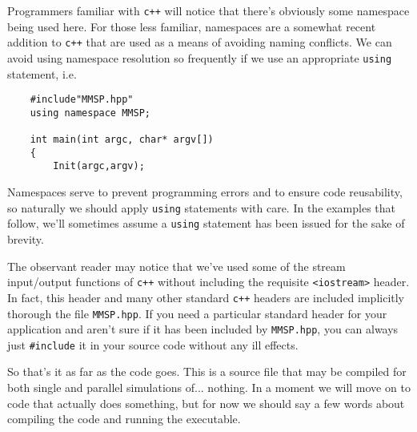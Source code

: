 Programmers familiar with {\tt c++} will notice that there's obviously some \MMSP namespace being used here.  For those less familiar, namespaces are a somewhat recent addition to {\tt c++} that are used as a means of avoiding naming conflicts.  We can avoid using namespace resolution so frequently if we use an appropriate {\tt using} statement, i.e. 
\begin{shadebox}
\begin{verbatim}
    #include"MMSP.hpp"
    using namespace MMSP;

    int main(int argc, char* argv[])
    {
        Init(argc,argv);
\end{verbatim}
\end{shadebox}
Namespaces serve to prevent programming errors and to ensure code reusability, so naturally we should apply {\tt using} statements with care.  In the examples that follow, we'll sometimes assume a {\tt using} statement has been issued for the sake of brevity.

The observant reader may notice that we've used some of the stream input/output functions of {\tt c++} without including the requisite {\tt <iostream>} header.  In fact, this header and many other standard {\tt c++} headers are included implicitly thorough the file {\tt MMSP.hpp}.  If you need a particular standard header for your application and aren't sure if it has been included by {\tt MMSP.hpp}, you can always just {\tt \#include} it in your source code without any ill effects.

So that's it as far as the code goes.  This is a source file that may be compiled for both single and parallel simulations of... nothing.  In a moment we will move on to code that actually does something, but for now we should say a few words about compiling the code and running the executable.

